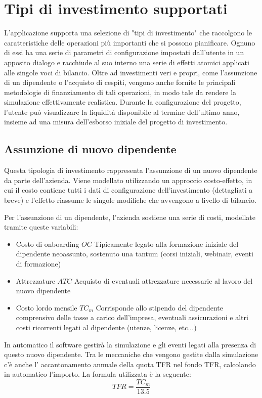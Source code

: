 \documentclass{article}
\begin{document}
\section{Tipi di investimento supportati}
L'applicazione supporta una selezione di "tipi di investimento" che raccolgono le caratteristiche delle operazioni più importanti che si possono pianificare. Ognuno di essi ha una serie di parametri di configurazione impostati dall'utente in un apposito dialogo e racchiude al suo interno una serie di effetti atomici applicati alle singole voci di bilancio. Oltre ad investimenti veri e propri, come l'assunzione di un dipendente o l'acquisto di cespiti, vengono anche fornite le principali metodologie di finanziamento di tali operazioni, in modo tale da rendere la simulazione effettivamente realistica. 
Durante la configurazione del progetto, l'utente può visualizzare la liquidità disponibile al termine dell'ultimo anno, insieme ad una misura dell'esborso iniziale del progetto di investimento. 

\subsection{Assunzione di nuovo dipendente}

Questa tipologia di investimento rappresenta l'assunzione di un nuovo dipendente da parte dell'azienda. Viene modellato utilizzando un approccio costo-effetto, in cui il costo contiene tutti i dati di configurazione dell'investimento (dettagliati a breve) e l'effetto riassume le singole modifiche che avvengono a livello di bilancio.  

Per l'assunzione di un dipendente, l'azienda sostiene una serie di costi, modellate tramite queste variabili: 
\begin{itemize}
    \item Costo di onboarding $OC$ Tipicamente legato alla formazione iniziale del dipendente neoassunto, sostenuto una tantum (corsi iniziali, webinair, eventi di formazione)
    \item Attrezzature $ATC$ Acquisto di eventuali attrezzature necessarie al lavoro del nuovo dipendente
    \item Costo lordo mensile $TC_m$ Corrisponde allo stipendo del dipendente comprensivo delle tasse a carico dell'impresa, eventuali assicurazioni e altri costi ricorrenti legati al dipendente (utenze, licenze, etc...)
\end{itemize}

In automatico il software gestirà la simulazione e gli eventi legati alla presenza di questo nuovo dipendente. 
Tra le meccaniche che vengono gestite dalla simulazione c'è anche l'
accantonamento annuale della quota TFR nel fondo TFR, calcolando in automatico l'importo. La formula utilizzata è la seguente: 
\[
TFR = \frac{TC_m}{13.5}
\]
\end{document}

